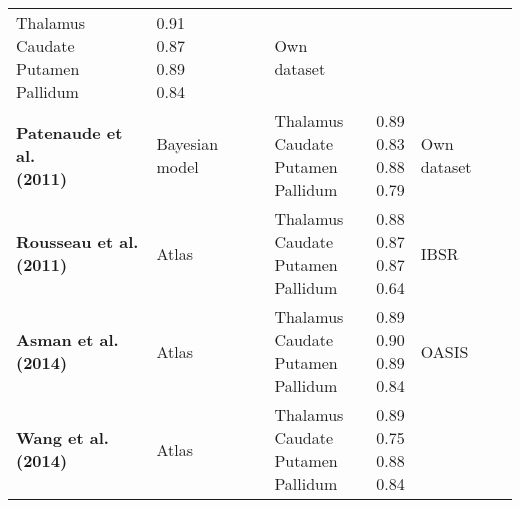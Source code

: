 \documentclass[twoside,fleqn,espcrc2]{elsarticle}
\begin{document}
\begin{table}[h!]
\begin{tabular}{lllll}
\parbox{1.5cm}{Thalamus \\ Caudate \\ Putamen \\ Pallidum  }   &
\parbox{1.0cm}{ 0.91\\0.87\\0.89\\0.84}   &
\parbox{2cm}{Own dataset}\\
\addlinespace
\parbox{3cm}{\textbf{Patenaude et al. \cite{patenaude2011bayesian} \\ (2011)}} & 
\parbox{1.5cm}{Bayesian model} &
\parbox{1.5cm}{Thalamus \\ Caudate \\ Putamen \\ Pallidum  }   &
\parbox{1.0cm}{ 0.89\\0.83\\0.88\\0.79}   &
\parbox{2cm}{Own dataset}\\
\addlinespace
\parbox{3cm}{\textbf{Rousseau et al. \cite{rousseau2011supervised}\\ (2011) }} & 
\parbox{1.5cm}{Atlas} &
\parbox{1.5cm}{Thalamus \\ Caudate \\ Putamen \\ Pallidum  }   &
\parbox{1.0cm}{ 0.88\\0.87\\0.87\\0.64}   &
\parbox{2cm}{IBSR}\\
\addlinespace
\parbox{3cm}{\textbf{Asman et al. \cite{asman2014groupwise} \\ (2014)}} & 
\parbox{1.5cm}{Atlas} &
\parbox{1.5cm}{Thalamus \\ Caudate \\ Putamen \\ Pallidum  }   &
\parbox{1.0cm}{ 0.89\\0.90\\0.89\\0.84}   &
\parbox{2cm}{OASIS}\\
\addlinespace
\parbox{3cm}{\textbf{Wang et al. \cite{wang2014multi} \\ (2014) }} & 
\parbox{1.5cm}{Atlas} &
\parbox{1.5cm}{Thalamus \\ Caudate \\ Putamen \\ Pallidum  }   &
\parbox{1.0cm}{ 0.89\\0.75\\0.88\\0.84}   &

\end{tabular}
\end{table}
\end{document}
